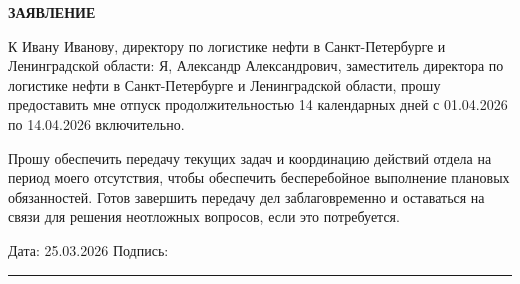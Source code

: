\documentclass[12pt]{article}
\begin{document}
\begin{center}
\textbf{\LARGE ЗАЯВЛЕНИЕ}
\end{center}

\vspace{1cm}




К Ивану Иванову, директору по логистике нефти в Санкт-Петербурге и Ленинградской области: Я, Александр Александрович, заместитель директора по логистике нефти в Санкт-Петербурге и Ленинградской области, прошу предоставить мне отпуск продолжительностью 14 календарных дней с 01.04.2026 по 14.04.2026 включительно.

Прошу обеспечить передачу текущих задач и координацию действий отдела на период моего отсутствия, чтобы обеспечить бесперебойное выполнение плановых обязанностей. Готов завершить передачу дел заблаговременно и оставаться на связи для решения неотложных вопросов, если это потребуется.

\vfill

\noindent
Дата: 25.03.2026 \hfill Подпись: \rule{5cm}{0.4pt}
\end{document}

